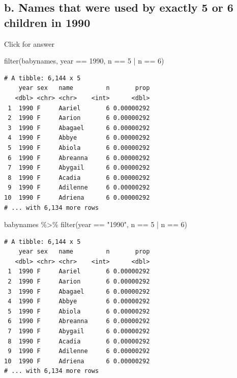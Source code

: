 \documentclass[
]{book}
\newenvironment{Shaded}{\begin{snugshade}}{\end{snugshade}}
\newcommand{\DecValTok}[1]{\textcolor[rgb]{0.00,0.00,0.81}{#1}}
\newcommand{\FunctionTok}[1]{\textcolor[rgb]{0.00,0.00,0.00}{#1}}
\newcommand{\NormalTok}[1]{#1}
\newcommand{\SpecialCharTok}[1]{\textcolor[rgb]{0.00,0.00,0.00}{#1}}
\newcommand{\StringTok}[1]{\textcolor[rgb]{0.31,0.60,0.02}{#1}}
\begin{document}
\hypertarget{b.-names-that-were-used-by-exactly-5-or-6-children-in-1990}{%
\subsection{b. Names that were used by exactly 5 or 6 children in 1990}\label{b.-names-that-were-used-by-exactly-5-or-6-children-in-1990}}

Click for answer

\begin{Shaded}
\begin{Highlighting}[]
\FunctionTok{filter}\NormalTok{(babynames, year }\SpecialCharTok{==} \DecValTok{1990}\NormalTok{, n }\SpecialCharTok{==} \DecValTok{5} \SpecialCharTok{|}\NormalTok{ n }\SpecialCharTok{==} \DecValTok{6}\NormalTok{)}
\end{Highlighting}
\end{Shaded}

\begin{verbatim}
# A tibble: 6,144 x 5
    year sex   name         n       prop
   <dbl> <chr> <chr>    <int>      <dbl>
 1  1990 F     Aariel       6 0.00000292
 2  1990 F     Aarion       6 0.00000292
 3  1990 F     Abagael      6 0.00000292
 4  1990 F     Abbye        6 0.00000292
 5  1990 F     Abiola       6 0.00000292
 6  1990 F     Abreanna     6 0.00000292
 7  1990 F     Abygail      6 0.00000292
 8  1990 F     Acadia       6 0.00000292
 9  1990 F     Adilenne     6 0.00000292
10  1990 F     Adriena      6 0.00000292
# ... with 6,134 more rows
\end{verbatim}

\begin{Shaded}
\begin{Highlighting}[]
\NormalTok{babynames }\SpecialCharTok{\%\textgreater{}\%} \FunctionTok{filter}\NormalTok{(year }\SpecialCharTok{==} \StringTok{"1990"}\NormalTok{, n }\SpecialCharTok{==} \DecValTok{5} \SpecialCharTok{|}\NormalTok{ n }\SpecialCharTok{==} \DecValTok{6}\NormalTok{)}
\end{Highlighting}
\end{Shaded}

\begin{verbatim}
# A tibble: 6,144 x 5
    year sex   name         n       prop
   <dbl> <chr> <chr>    <int>      <dbl>
 1  1990 F     Aariel       6 0.00000292
 2  1990 F     Aarion       6 0.00000292
 3  1990 F     Abagael      6 0.00000292
 4  1990 F     Abbye        6 0.00000292
 5  1990 F     Abiola       6 0.00000292
 6  1990 F     Abreanna     6 0.00000292
 7  1990 F     Abygail      6 0.00000292
 8  1990 F     Acadia       6 0.00000292
 9  1990 F     Adilenne     6 0.00000292
10  1990 F     Adriena      6 0.00000292
# ... with 6,134 more rows
\end{verbatim}
\end{document}
